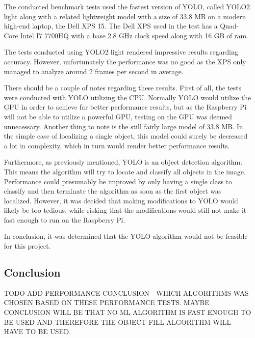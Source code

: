 The conducted benchmark tests used the fastest version of YOLO, called YOLO2 light along with a related lightweight model with a size of 33.8 MB on a modern high-end laptop, the Dell XPS 15.
The Dell XPS used in the test has a Quad-Core Intel I7 7700HQ with a base 2.8 GHz clock speed along with 16 GB of ram.

The tests conducted using YOLO2 light rendered impressive results regarding accuracy.
However, unfortunately the performance was no good as the XPS only managed to analyze around 2 frames per second in average.

There should be a couple of notes regarding these results.
First of all, the tests were conducted with YOLO utilizing the CPU.
Normally YOLO would utilize the GPU in order to achieve far better performance results, but as the Raspberry Pi will not be able to utilize a powerful GPU, testing on the GPU was deemed unnecessary. 
Another thing to note is the still fairly large model of 33.8 MB.
In the simple case of localizing a single object, this model could surely be decreased a lot in complexity, which in turn would render better performance results.

Furthermore, as previously mentioned, YOLO is an object detection algorithm.
This means the algorithm will try to locate and classify all objects in the image.
Performance could presumably be improved by only having a single class to classify and then terminate the algorithm as soon as the first object was localized.
However, it was decided that making modifications to YOLO would likely be too tedious, while risking that the modifications would still not make it fast enough to run on the Raspberry Pi.

In conclusion, it was determined that the YOLO algorithm would not be feasible for this project.

\subsection{Conclusion}
TODO ADD PERFORMANCE CONCLUSION - WHICH ALGORITHMS WAS CHOSEN BASED ON THESE PERFORMANCE TESTS. 
MAYBE CONCLUSION WILL BE THAT NO ML ALGORITHM IS FAST ENOUGH TO BE USED AND THEREFORE THE OBJECT FILL ALGORITHM WILL HAVE TO BE USED.